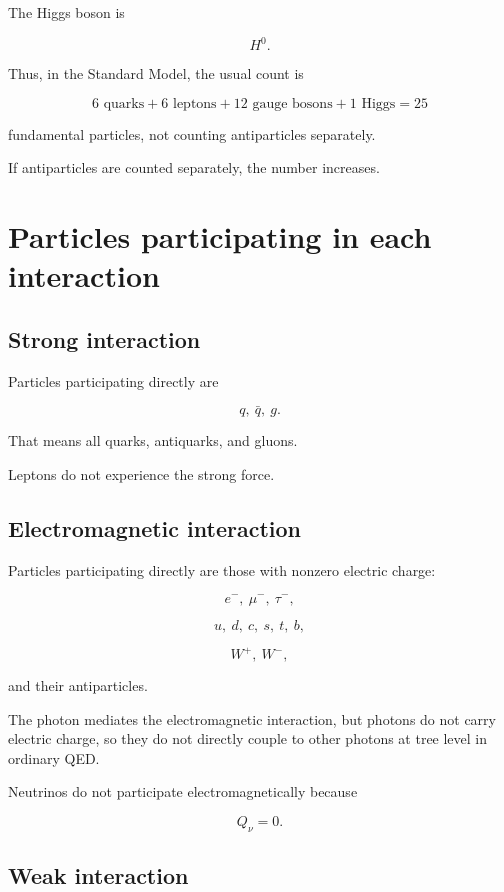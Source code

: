 \documentclass[12pt]{article}
\begin{document}
The Higgs boson is

\[
H^0.
\]

Thus, in the Standard Model, the usual count is

\begin{equation}
6\text{ quarks}+6\text{ leptons}+12\text{ gauge bosons}+1\text{ Higgs}=25
\end{equation}

fundamental particles, not counting antiparticles separately.

If antiparticles are counted separately, the number increases.

\section*{Particles participating in each interaction}

\subsection*{Strong interaction}

Particles participating directly are

\[
q,\ \bar{q},\ g.
\]

That means all quarks, antiquarks, and gluons.

Leptons do not experience the strong force.

\subsection*{Electromagnetic interaction}

Particles participating directly are those with nonzero electric charge:

\[
e^-,\ \mu^-,\ \tau^-,
\]

\[
u,\ d,\ c,\ s,\ t,\ b,
\]

\[
W^+,\ W^-,
\]

and their antiparticles.

The photon mediates the electromagnetic interaction, but photons do not carry electric charge, so they do not directly couple to other photons at tree level in ordinary QED.

Neutrinos do not participate electromagnetically because

\begin{equation}
Q_{\nu}=0.
\end{equation}

\subsection*{Weak interaction}
\end{document}
